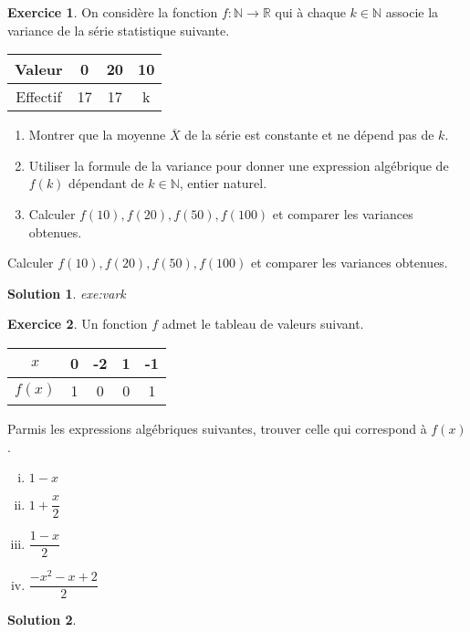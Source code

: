 \documentclass[a4paper, 14pt]{extarticle}
\theoremstyle{plain}
\newtheorem*{sol}{Solution}
\theoremstyle{definition}
\newtheorem{ex}{Exercice}
\newcommand{\R}{\mathbb{R}}
\newcommand{\N}{\mathbb{N}}
\newcommand{\exe}[2]{
		\begin{ex} #1  \end{ex}
		\begin{sol} #2 \end{sol}
	}
\newcommand{\exe}[2]{
		\begin{ex} #1  \end{ex}
	}
\begin{document}
	
	\exe{
		On considère la fonction $f:\N\rightarrow\R$ qui à chaque $k\in\N$ associe la variance de la série statistique suivante.
		
		
		\begin{center}
		\begin{tabular}{|c|c|c|c|}\hline
		Valeur   & 0 & 20 & 10 \\ \hline
		Effectif & 17 & 17 & k \\ \hline
		\end{tabular}
		\end{center}
		
		\begin{enumerate}
			\item
			Montrer que la moyenne $\overline{X}$ de la série est constante et ne dépend pas de $k$.
			\item
			Utiliser la formule de la variance pour donner une expression algébrique de $f(k)$ dépendant de $k\in\N$, entier naturel.
			\item
			Calculer $f(10), f(20), f(50), f(100)$ et comparer les variances obtenues.
		\end{enumerate}
		
		Calculer $f(10), f(20), f(50), f(100)$ et comparer les variances obtenues.
	}{exe:vark}
	

	\exe{
		Un fonction $f$ admet le tableau de valeurs suivant.
			\begin{center}
			\begin{tabular}{|c|c|c|c|c|}\hline
				$x$ & 0 & -2 & 1 & -1 \\ \hline
				$f(x)$ & 1 & 0 & 0 & 1 \\ \hline
			\end{tabular}
			\end{center}
		Parmis les expressions algébriques suivantes, trouver celle qui correspond à $f(x)$.
			\begin{multicols}{2}
			\begin{enumerate}[i)]
				\item $1-x$
				\item $1+\dfrac{x}2$
				\item $\dfrac{1-x}2$
				\item $\dfrac{-x^2 - x + 2}2$
			\end{enumerate}
			\end{multicols}
	}{}
	
	
	
	
	
\end{document}
